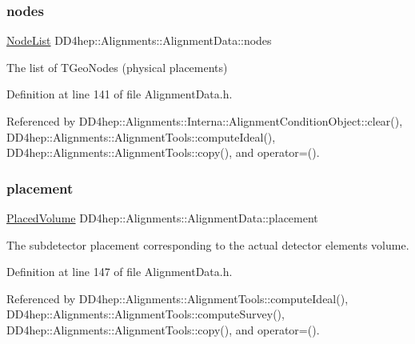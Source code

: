 \subsubsection{\texorpdfstring{nodes}{nodes}}
{\footnotesize\ttfamily \hyperlink{class_d_d4hep_1_1_alignments_1_1_alignment_data_a3a667fd798d7523d75accee832d64521}{Node\+List} D\+D4hep\+::\+Alignments\+::\+Alignment\+Data\+::nodes}



The list of T\+Geo\+Nodes (physical placements) 



Definition at line 141 of file Alignment\+Data.\+h.



Referenced by D\+D4hep\+::\+Alignments\+::\+Interna\+::\+Alignment\+Condition\+Object\+::clear(), D\+D4hep\+::\+Alignments\+::\+Alignment\+Tools\+::compute\+Ideal(), D\+D4hep\+::\+Alignments\+::\+Alignment\+Tools\+::copy(), and operator=().

\hypertarget{class_d_d4hep_1_1_alignments_1_1_alignment_data_a0da8f92652a64d0ca69a1c884bd5b034}{}\label{class_d_d4hep_1_1_alignments_1_1_alignment_data_a0da8f92652a64d0ca69a1c884bd5b034} 
\subsubsection{\texorpdfstring{placement}{placement}}
{\footnotesize\ttfamily \hyperlink{class_d_d4hep_1_1_alignments_1_1_alignment_data_aab2d43f5a4a4c2163e0a04905306525a}{Placed\+Volume} D\+D4hep\+::\+Alignments\+::\+Alignment\+Data\+::placement}



The subdetector placement corresponding to the actual detector element\textquotesingle{}s volume. 



Definition at line 147 of file Alignment\+Data.\+h.



Referenced by D\+D4hep\+::\+Alignments\+::\+Alignment\+Tools\+::compute\+Ideal(), D\+D4hep\+::\+Alignments\+::\+Alignment\+Tools\+::compute\+Survey(), D\+D4hep\+::\+Alignments\+::\+Alignment\+Tools\+::copy(), and operator=().

\hypertarget{class_d_d4hep_1_1_alignments_1_1_alignment_data_a468b2dee055c6e6894ae65d37a53712e}{}\label{class_d_d4hep_1_1_alignments_1_1_alignment_data_a468b2dee055c6e6894ae65d37a53712e} 
